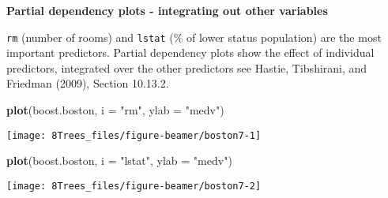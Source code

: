 \documentclass[10pt,ignorenonframetext,]{beamer}
\newenvironment{Shaded}{\begin{snugshade}}{\end{snugshade}}
\newcommand{\DataTypeTok}[1]{\textcolor[rgb]{0.13,0.29,0.53}{#1}}
\newcommand{\KeywordTok}[1]{\textcolor[rgb]{0.13,0.29,0.53}{\textbf{#1}}}
\newcommand{\NormalTok}[1]{#1}
\newcommand{\StringTok}[1]{\textcolor[rgb]{0.31,0.60,0.02}{#1}}
\begin{document}
\begin{frame}[fragile]

\textbf{Partial dependency plots - integrating out other variables }

\small

\texttt{rm} (number of rooms) and \texttt{lstat} (\% of lower status
population) are the most important predictors. Partial dependency plots
show the effect of individual predictors, integrated over the other
predictors see Hastie, Tibshirani, and Friedman (2009), Section 10.13.2.

\vspace{2mm}

\scriptsize

\begin{Shaded}
\begin{Highlighting}[]
\KeywordTok{plot}\NormalTok{(boost.boston, }\DataTypeTok{i =} \StringTok{"rm"}\NormalTok{, }\DataTypeTok{ylab =} \StringTok{"medv"}\NormalTok{)}
\end{Highlighting}
\end{Shaded}

\begin{center}\texttt{[image: 8Trees\_files/figure-beamer/boston7-1]} \end{center}

\begin{Shaded}
\begin{Highlighting}[]
\KeywordTok{plot}\NormalTok{(boost.boston, }\DataTypeTok{i =} \StringTok{"lstat"}\NormalTok{, }\DataTypeTok{ylab =} \StringTok{"medv"}\NormalTok{)}
\end{Highlighting}
\end{Shaded}

\begin{center}\texttt{[image: 8Trees\_files/figure-beamer/boston7-2]} \end{center}

\end{frame}
\end{document}
